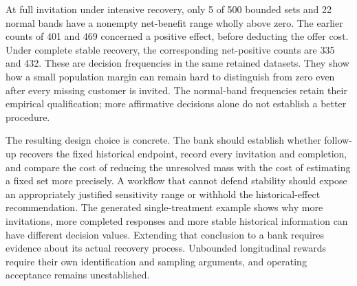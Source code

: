 At full invitation under intensive recovery, only 5 of 500 bounded sets
and 22 normal bands have a nonempty net-benefit range wholly above zero.
The earlier counts of 401 and 469 concerned a positive effect, before
deducting the offer cost. Under complete stable recovery, the corresponding
net-positive counts are 335 and 432. These are decision frequencies in the
same retained datasets. They show how a small population margin can remain
hard to distinguish from zero even after every missing customer is invited. The normal-band frequencies retain their empirical qualification;
more affirmative decisions alone do not establish a better procedure.

The resulting design choice is concrete. The bank should establish whether
follow-up recovers the fixed historical endpoint, record every invitation and
completion, and compare the cost of reducing the unresolved mass with the
cost of estimating a fixed set more precisely. A workflow that cannot defend
stability should expose an appropriately justified sensitivity range or
withhold the historical-effect recommendation. The generated single-treatment
example shows why more invitations, more completed responses and more stable
historical information can have different decision values. Extending that
conclusion to a bank requires evidence about its actual recovery process.
Unbounded longitudinal rewards require their own identification and sampling
arguments, and operating acceptance remains unestablished.

